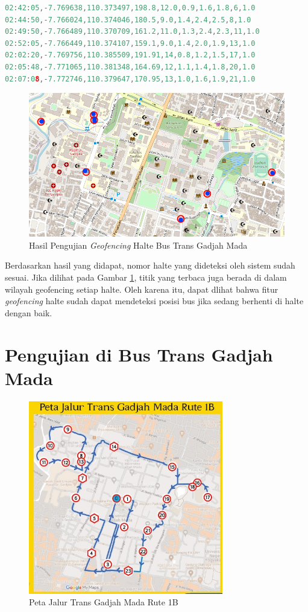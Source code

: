 \begin{lstlisting}[language=c]
02:42:05,-7.769638,110.373497,198.8,12.0,0.9,1.6,1.8,6,1.0
02:44:50,-7.766024,110.374046,180.5,9.0,1.4,2.4,2.5,8,1.0
02:49:50,-7.766489,110.370709,161.2,11.0,1.3,2.4,2.3,11,1.0
02:52:05,-7.766449,110.374107,159.1,9.0,1.4,2.0,1.9,13,1.0
02:02:20,-7.769756,110.385509,191.91,14,0.8,1.2,1.5,17,1.0
02:05:48,-7.771065,110.381348,164.69,12,1.1,1.4,1.8,20,1.0
02:07:08,-7.772746,110.379647,170.95,13,1.0,1.6,1.9,21,1.0
\end{lstlisting}

\begin{figure}[H]
	\centering
	\includegraphics[width=12cm]{contents/chapter-4/geofencing/halte.png}
	\caption{Hasil Pengujian \textit{Geofencing}  Halte Bus Trans Gadjah Mada}
	\label{Fig: geofencing-2}
\end{figure}

Berdasarkan hasil yang didapat, nomor halte yang dideteksi oleh sistem sudah sesuai. Jika dilihat pada Gambar \ref{Fig: geofencing-2}, titik yang terbaca juga berada di dalam wilayah geofencing setiap halte. Oleh karena itu, dapat dlihat bahwa fitur \textit{geofencing} halte sudah dapat mendeteksi posisi bus jika sedang berhenti di halte dengan baik.

\section{Pengujian di Bus Trans Gadjah Mada}
\begin{figure}[H]
	\centering
	\includegraphics[width=8.5cm]{contents/chapter-4/pengujian-bergerak/Peta-Jalur-Rute-1B.jpg}
	\caption{Peta Jalur Trans Gadjah Mada Rute 1B}
	\label{Fig: peta-1b}
\end{figure}

